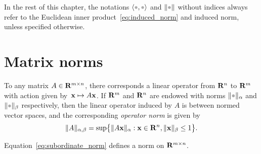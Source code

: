 In the rest of this chapter,
the notations $\ip{\placeholder,\placeholder}$ and $\norm{\placeholder}$ without indices always refer to the Euclidean inner product~\eqref{eq:induced_norm} and induced norm,
unless specified otherwise.

\section{Matrix norms}%
\label{sec:matrix_norms}

To any matrix $A \in \mathbf R^{m \times n}$, there corresponds a linear operator from $\mathbf R^n$ to $\mathbf R^m$
with action given by~$\mathbf x \mapsto A \mathbf x$.
If $\mathbf R^m$ and $\mathbf R^n$ are endowed with norms $\norm{\placeholder}_{\alpha}$ and $\norm{\placeholder}_{\beta}$ respectively,
then the linear operator induced by $A$ is between normed vector spaces,
and the corresponding \emph{operator norm} is given by
\begin{equation}
    \label{eq:subordinate_norm}
    \lVert A\rVert_{\alpha,\beta} = \sup \bigl\{ \lVert A \mathbf x\rVert_{\alpha} : \mathbf x \in \mathbf R^n, \lVert\mathbf x\rVert_{\beta} \leq 1 \bigr\}.
\end{equation}
\begin{proposition}
    Equation~\eqref{eq:subordinate_norm} defines a norm on $\mathbf R^{m \times n}$.
\end{proposition}
